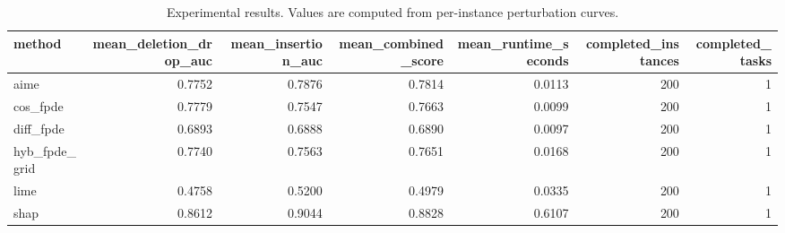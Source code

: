\begin{table}[t]
\caption{Experimental results. Values are computed from per-instance perturbation curves.}
\label{tab:main_results_computed}
\centering
\begin{tabular}{lrrrrrr}
\toprule
method & mean\_deletion\_drop\_auc & mean\_insertion\_auc & mean\_combined\_score & mean\_runtime\_seconds & completed\_instances & completed\_tasks \\
\midrule
aime & 0.7752 & 0.7876 & 0.7814 & 0.0113 & 200 & 1 \\
cos\_fpde & 0.7779 & 0.7547 & 0.7663 & 0.0099 & 200 & 1 \\
diff\_fpde & 0.6893 & 0.6888 & 0.6890 & 0.0097 & 200 & 1 \\
hyb\_fpde\_grid & 0.7740 & 0.7563 & 0.7651 & 0.0168 & 200 & 1 \\
lime & 0.4758 & 0.5200 & 0.4979 & 0.0335 & 200 & 1 \\
shap & 0.8612 & 0.9044 & 0.8828 & 0.6107 & 200 & 1 \\
\bottomrule
\end{tabular}

\end{table}
